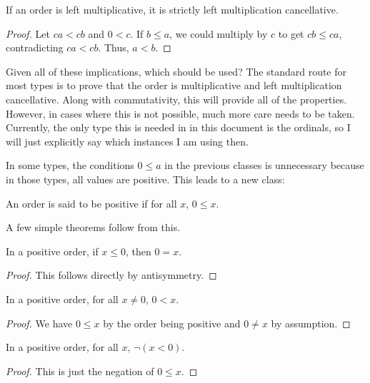 \documentclass[../../math.tex]{subfiles}
\begin{document}
\begin{instance} \label{lt_mult_lcancel2}
    If an order is left multiplicative, it is strictly left multiplication
    cancellative.
\end{instance}
\begin{proof}
    Let $ca < cb$ and $0 < c$.  If $b \leq a$, we could multiply by $c$ to get
    $cb \leq ca$, contradicting $ca < cb$.  Thus, $a < b$.
\end{proof}

Given all of these implications, which should be used?  The standard route for
most types is to prove that the order is multiplicative and left multiplication
cancellative.  Along with commutativity, this will provide all of the
properties.  However, in cases where this is not possible, much more care needs
to be taken.  Currently, the only type this is needed in in this document is the
ordinals, so I will just explicitly say which instances I am using then.

In some types, the conditions $0 \leq a$ in the previous classes is unnecessary
because in those types, all values are positive.  This leads to a new class:

\begin{class}
    An order is said to be positive if for all $x$, $0 \leq x$.
\end{class}

A few simple theorems follow from this.

\begin{theorem} \label{all_neg_eq}
    In a positive order, if $x \leq 0$, then $0 = x$.
\end{theorem}
\begin{proof}
    This follows directly by antisymmetry.
\end{proof}

\begin{theorem} \label{all_pos2}
    In a positive order, for all $x \neq 0$, $0 < x$.
\end{theorem}
\begin{proof}
    We have $0 \leq x$ by the order being positive and $0 \neq x$ by assumption.
\end{proof}

\begin{theorem} \label{not_neg}
    In a positive order, for all $x$, $\neg(x < 0)$.
\end{theorem}
\begin{proof}
    This is just the negation of $0 \leq x$.
\end{proof}
\end{document}
